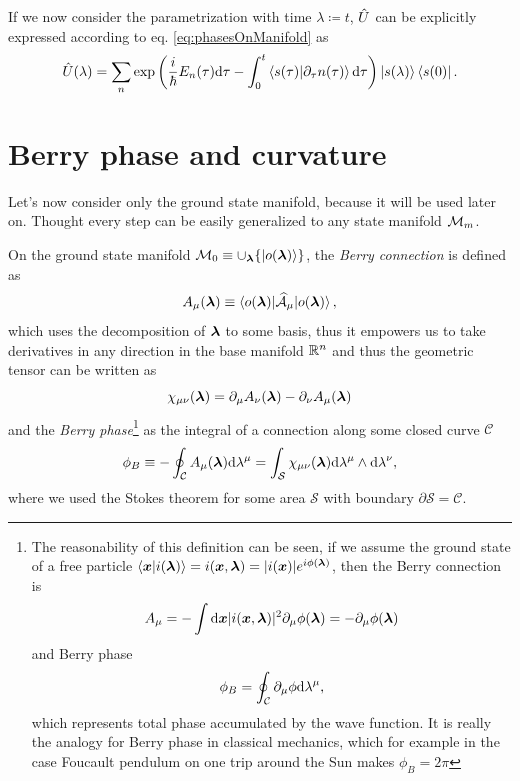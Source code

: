 If we now consider the parametrization with time $\lambda\coloneqq t$, $\hat{U}$ can be explicitly expressed according to eq. \ref{eq:phasesOnManifold} as
\begin{equation}
    \hat{U}(\lambda)=\sum_n \exp\left(\frac{i}{\hbar}E_n(\tau)\mathrm{d} \tau - \int_0^t \braket{s(\tau)|\partial_\tau n(\tau)}\mathrm{d}\tau\right)\ket{s(\lambda)}\bra{s(0)}.
    \label{eq:evolutionUduringTransition}
\end{equation}

\section{Berry phase and curvature}
Let's now consider only the ground state manifold, because it will be used later on. Thought every step can be easily generalized to any state manifold $\mathcal{M}_m$.

On the ground state manifold $\mathcal{M}_0\equiv \cup_{\bm\lambda} \{\ket{o({\bm\lambda})}\}$, the \emph{Berry connection} is defined as
\begin{equation}
    A_\mu({\bm\lambda})\equiv \braket{o({\bm\lambda})|\mathcal{\widehat{A}}_\mu|o({\bm\lambda})},
\end{equation}
which uses the decomposition of ${\bm\lambda}$ to some basis, thus it empowers us to take derivatives in any direction in the base manifold $\mathbb{R}^n$ and thus the geometric tensor can be written as
\begin{equation}
    \chi_{\mu\nu}({\bm\lambda}) = \partial_\mu A_\nu({\bm\lambda})-\partial_\nu A_\mu({\bm\lambda})
\end{equation}
and the \emph{Berry phase}\footnote{
    The reasonability of this definition can be seen, if we assume the ground state of a free particle
        $\braket{\bm{x}|i({\bm\lambda})}=i(\bm{x},{\bm\lambda})= |i(\bm{x})|e^{i\phi({\bm\lambda})}$,
    then the Berry connection is
    \begin{equation}
        A_\mu=-\int \mathrm{d} \bm{x}|i(\bm{x},{\bm\lambda})|^2\partial_\mu \phi({\bm\lambda}) = -\partial_\mu \phi({\bm\lambda})
    \end{equation} 
    and Berry phase
    \begin{equation}
        \phi_B=\oint_\mathcal{C} \partial_\mu \phi \mathrm{d} \lambda^\mu,
    \end{equation}
    which represents total phase accumulated by the wave function. It is really the analogy for Berry phase in classical mechanics, which for example in the case Foucault pendulum on one trip around the Sun makes $\phi_B=2\pi$
}
as the integral of a connection along some closed curve $\mathcal{C}$
\begin{equation}
    \phi_B\equiv-\oint_\mathcal{C} A_\mu({\bm\lambda})\mathrm{d} \lambda^\mu=\int_\mathcal{S} \chi_{\mu\nu}({\bm\lambda})\mathrm{d} \lambda^\mu \wedge \mathrm{d}\lambda^\nu,
\end{equation}
where we used the Stokes theorem for some area $\mathcal{S}$ with boundary $\partial\mathcal{S}=\mathcal{C}$.

